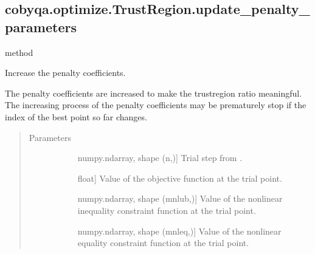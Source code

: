 \documentclass[letterpaper,10pt,english]{sphinxmanual}
\begin{document}
\begin{fulllineitems}
\subsection{cobyqa.optimize.TrustRegion.update\_penalty\_parameters}
\label{\detokenize{refs/generated/cobyqa.optimize.TrustRegion.update_penalty_parameters:cobyqa-optimize-trustregion-update-penalty-parameters}}\label{\detokenize{refs/generated/cobyqa.optimize.TrustRegion.update_penalty_parameters::doc}}
\sphinxAtStartPar
method

\begin{fulllineitems}
\label{\detokenize{refs/generated/cobyqa.optimize.TrustRegion.update_penalty_parameters:cobyqa.optimize.TrustRegion.update_penalty_parameters}}
\sphinxAtStartPar
Increase the penalty coefficients.

\sphinxAtStartPar
The penalty coefficients are increased to make the trust\sphinxhyphen{}region ratio
meaningful. The increasing process of the penalty coefficients may be
prematurely stop if the index of the best point so far changes.
\begin{quote}\begin{description}
\item[{Parameters}] \leavevmode\begin{description}
\item[{}] \leavevmode{[}numpy.ndarray, shape (n,){]}
\sphinxAtStartPar
Trial step from .

\item[{}] \leavevmode{[}float{]}
\sphinxAtStartPar
Value of the objective function at the trial point.

\item[{}] \leavevmode{[}numpy.ndarray, shape (mnlub,){]}
\sphinxAtStartPar
Value of the nonlinear inequality constraint function at the trial
point.

\item[{}] \leavevmode{[}numpy.ndarray, shape (mnleq,){]}
\sphinxAtStartPar
Value of the nonlinear equality constraint function at the trial
point.


\end{description}
\end{description}
\end{quote}
\end{fulllineitems}
\end{fulllineitems}
\end{document}
